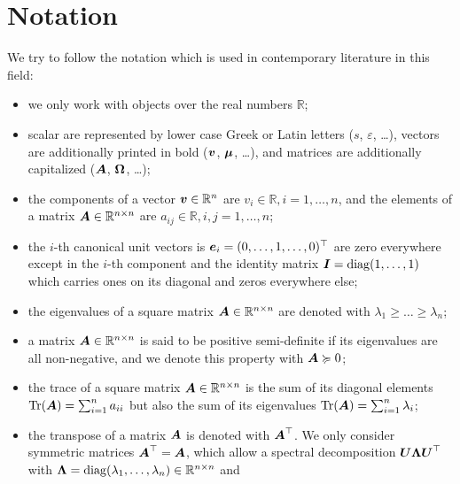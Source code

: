 \chapter*{Notation}
\label{chp:0-notation}

We try to follow the notation which is used in contemporary literature in this field:

\begin{itemize}
    \item we only work with objects over the real numbers $\mathbb{R}$;
    \item scalar are represented by lower case Greek or Latin letters ($s$, $\varepsilon$, \dots),
          vectors are additionally printed in bold ($\boldsymbol{v}$, $\boldsymbol{\mu}$, \dots),
          and matrices are additionally capitalized ($\boldsymbol{A}$, $\boldsymbol{\Omega}$, \dots);
    \item the components of a vector $\boldsymbol{v} \in \mathbb{R}^{n}$ are $v_i \in \mathbb{R}, i = 1, \dots, n$,
          and the elements of a matrix $\boldsymbol{A} \in \mathbb{R}^{n \times n}$ are $a_{ij} \in \mathbb{R}, i, j = 1, \dots, n$;
    \item the $i$-th canonical unit vectors is $\boldsymbol{e}_i = (0, \dots, 1, \dots, 0)^{\top}$
          are zero everywhere except in the $i$-th component and the identity matrix
          $\boldsymbol{I} = \operatorname{diag}(1, \dots, 1)$ which carries ones on its diagonal and 
          zeros everywhere else;
    \item the eigenvalues of a square matrix $\boldsymbol{A} \in \mathbb{R}^{n \times n}$
          are denoted with $\lambda_1 \geq \dots \geq \lambda_n$;
    \item a matrix $\boldsymbol{A} \in \mathbb{R}^{n \times n}$ is said to be positive
          semi-definite if its eigenvalues are all non-negative, and we denote
          this property with $\boldsymbol{A} \succcurlyeq 0$;
    \item the trace of a square matrix $\boldsymbol{A} \in \mathbb{R}^{n \times n}$ is
          the sum of its diagonal elements $\operatorname{Tr}(\boldsymbol{A}) = \sum_{i=1}^n a_{ii}$
          but also the sum of its eigenvalues $\operatorname{Tr}(\boldsymbol{A}) = \sum_{i=1}^n \lambda_i$;
    \item the transpose of a matrix $\boldsymbol{A}$ is denoted with $\boldsymbol{A}^{\top}$.
          We only consider symmetric matrices $\boldsymbol{A}^{\top} = \boldsymbol{A}$, which
          allow a spectral decomposition $\boldsymbol{U} \boldsymbol{\Lambda} \boldsymbol{U}^{\top}$
          with $\boldsymbol{\Lambda} = \operatorname{diag}(\lambda_1, \dots, \lambda_n) \in \mathbb{R}^{n \times n}$ and 

\end{itemize}
